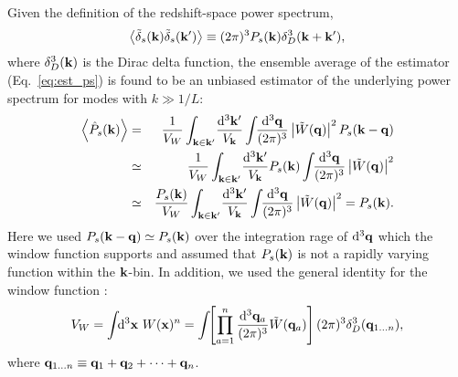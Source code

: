 \documentclass[prd,onecolumn,notitlepage,amsmath,amssymb,floatfix,superscriptaddress]{revtex4-1}
\newcommand{\bx}{{\bf x}}
\newcommand{\bk}{{\bf k}}
\newcommand{\bq}{{\bf q}}
\newcommand{\tdelta}{\tilde{\delta}}
\newcommand{\tW}{\tilde{W}}
\def\avrg#1{\left\langle #1 \right\rangle}
\begin{document}
Given the definition of the redshift-space power spectrum,
%
\begin{equation}
\avrg{\tdelta_s(\bk)\tdelta_s(\bk')}\equiv (2\pi)^3P_s(\bk)\delta^{3}_D(\bk+\bk'),
\end{equation}
%
where $\delta_D^3(\bk)$ is the Dirac delta function, the ensemble average of the estimator (Eq.~\ref{eq:est_ps}) is found to be an unbiased estimator
of the underlying power spectrum for modes with $k\gg 1/L$:
%
\begin{eqnarray}
\avrg{\hat{P}_s(\bk)}&=&\frac{1}{V_W}\int_{\bk\in \bk'}\!\frac{\mathrm{d}^3\bk'}{V_{\bk}}
\int\!\!\frac{\mathrm{d}^3\bq}{(2\pi)^3}\left|\tW(\bq)\right|^2P_s(\bk-\bq)\nonumber\\
&\simeq& \frac{1}{V_W}\int_{\bk\in \bk'}\!\frac{\mathrm{d}^3\bk'}{V_{\bk}}P_s(\bk)
\int\!\!\frac{\mathrm{d}^3\bq}{(2\pi)^3}\left|\tW(\bq)\right|^2\nonumber\\
&\simeq & \frac{P_s(\bk)}{V_W}\int_{\bk\in \bk'}\!\frac{\mathrm{d}^3\bk'}{V_{\bk}}
\int\!\!\frac{\mathrm{d}^3\bq}{(2\pi)^3}\left|\tW(\bq)\right|^2=P_s(\bk).
\end{eqnarray}
%
Here we used $P_s(\bk-\bq)\simeq P_s(\bk)$ over the integration rage of $\mathrm{d}^3\bq$ which the window function supports and assumed that $P_s(\bk)$
is not a rapidly  varying function within the $\bk$-bin. In addition, we used the general identity 
for the window function \cite{TakadaHu:13}:
%
\begin{equation}
V_W=\int\!\!\mathrm{d}^3\bx~W(\bx)^n=\int\!\!\left[\prod_{a=1}^{n}\frac{\mathrm{d}^3\bq_a}{(2\pi)^3}\tW(\bq_a)\right](2\pi)^3\delta_D^{3}(\bq_{1\dots n}),
\end{equation}
%
where $\bq_{1\dots n}\equiv \bq_1+\bq_2+\cdots+\bq_n$.
\end{document}
